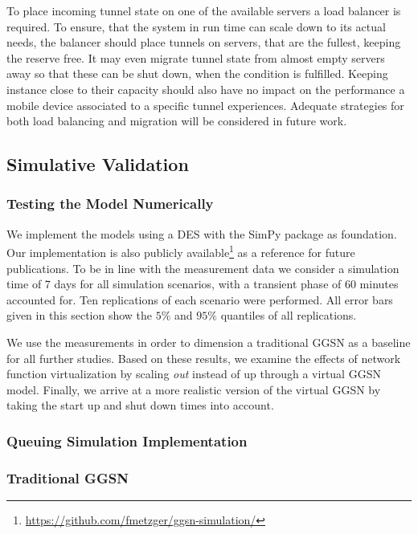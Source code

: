 To place incoming tunnel state on one of the available servers a load balancer is required. To ensure, that the system in run time can scale down to its actual needs, the balancer should place tunnels on servers, that are the fullest, keeping the reserve free. It may even migrate tunnel state from almost empty servers away so that these can be shut down, when the condition is fulfilled. Keeping instance close to their capacity should also have no impact on the performance a mobile device associated to a specific tunnel experiences. Adequate strategies for both load balancing and migration will be considered in future work.




\subsection{Simulative Validation} 


\subsubsection{Testing the Model Numerically}
\label{c4:sec:model-numerical}

We implement the models using a \gls{DES} with the SimPy \cite{simpy} package as foundation. Our implementation is also publicly available\footnote{\url{https://github.com/fmetzger/ggsn-simulation/}} as a reference for future publications. To be in line with the measurement data we consider a simulation time of 7 days for all simulation scenarios, with a transient phase of 60 minutes accounted for. Ten replications of each scenario were performed. All error bars given in this section show the $5\%$ and $95\%$ quantiles of all replications.


We use the measurements in order to dimension a traditional \gls{GGSN} as a baseline for all further studies. Based on these results, we examine the effects of network function virtualization by scaling \emph{out} instead of up through a virtual \gls{GGSN} model. Finally, we arrive at a more realistic version of the virtual \gls{GGSN} by taking the start up and shut down times into account.


\subsubsection{Queuing Simulation Implementation}


\subsubsection{Traditional GGSN}
\label{c4:sec:eval_traditional_ggsn}

